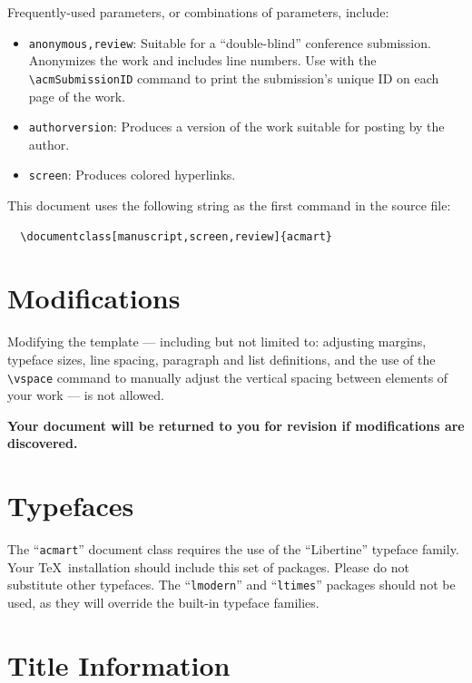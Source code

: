 \documentclass[manuscript,screen,review]{acmart}
\providecommand{\tightlist}{%
  \setlength{\itemsep}{0pt}\setlength{\parskip}{0pt}}\usepackage{longtable,booktabs,array}
\begin{document}
Frequently-used parameters, or combinations of parameters, include:

\begin{itemize}
\tightlist
\item
  \texttt{anonymous,review}: Suitable for a ``double-blind'' conference
  submission. Anonymizes the work and includes line numbers. Use with
  the \texttt{\textbackslash{}acmSubmissionID} command to print the
  submission's unique ID on each page of the work.
\item
  \texttt{authorversion}: Produces a version of the work suitable for
  posting by the author.
\item
  \texttt{screen}: Produces colored hyperlinks.
\end{itemize}

This document uses the following string as the first command in the
source file:

\begin{verbatim}
  \documentclass[manuscript,screen,review]{acmart}
\end{verbatim}

\hypertarget{modifications}{%
\section{Modifications}\label{modifications}}

Modifying the template --- including but not limited to: adjusting
margins, typeface sizes, line spacing, paragraph and list definitions,
and the use of the \texttt{\textbackslash{}vspace} command to manually
adjust the vertical spacing between elements of your work --- is not
allowed.

\textbf{Your document will be returned to you for revision if
modifications are discovered.}

\hypertarget{typefaces}{%
\section{Typefaces}\label{typefaces}}

The ``\texttt{acmart}'' document class requires the use of the
``Libertine'' typeface family. Your \TeX~installation should include
this set of packages. Please do not substitute other typefaces. The
``\texttt{lmodern}'' and ``\texttt{ltimes}'' packages should not be
used, as they will override the built-in typeface families.

\hypertarget{title-information}{%
\section{Title Information}\label{title-information}}
\end{document}

